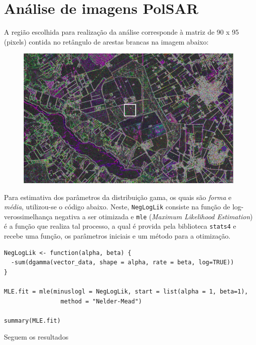 \documentclass[12pt]{article}
\begin{document}
\section{Análise de imagens PolSAR}

A região escolhida para realização da análise corresponde à matriz de 90 x 95 (pixels) contida no retângulo de arestas brancas na imagem abaixo:

\begin{figure}[hbt]
    \centering
    \includegraphics[scale = 0.65]{../../Images/Report_18_09_17/region.png}
\end{figure}

Para estimativa dos parâmetros da distribuição gama, os quais são \textit{forma} e \textit{média}, utilizou-se o código abaixo. 
Neste, \texttt{NegLogLik} consiste na função de log-verossimelhança negativa a ser otimizada e \texttt{mle} (\textit{Maximum Likelihood Estimation}) é a função que realiza tal processo, a qual é provida pela biblioteca \texttt{stats4} e recebe uma função, os parâmetros iniciais e um método para a otimização.

\begin{verbatim}
NegLogLik <- function(alpha, beta) {
  -sum(dgamma(vector_data, shape = alpha, rate = beta, log=TRUE))
}

MLE.fit = mle(minuslogl = NegLogLik, start = list(alpha = 1, beta=1), 
                method = "Nelder-Mead")

summary(MLE.fit)
\end{verbatim}

Seguem os resultados
\end{document}
